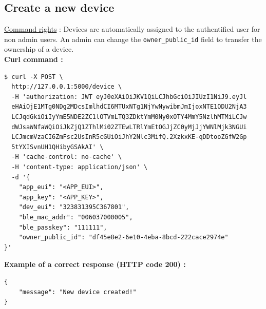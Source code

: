 \subsection{Create a new device}
\underline{Command rights} : Devices are automatically assigned to the authentified user for non admin users. An admin can change the \texttt{owner\_public\_id} field to transfer the ownership of a device.\\

\newpage
\textbf{Curl command :}

\begin{tcolorbox}[top=-3mm, bottom=-3mm, left=0mm, right=0mm, enhanced, breakable, colback=LightGray, colframe=DarkGray, colbacktitle=DarkGray]
\begin{verbatim}
$ curl -X POST \
  http://127.0.0.1:5000/device \
  -H 'authorization: JWT eyJ0eXAiOiJKV1QiLCJhbGciOiJIUzI1NiJ9.eyJl
  eHAiOjE1MTg0NDg2MDcsImlhdCI6MTUxNTg1NjYwNywibmJmIjoxNTE1ODU2NjA3
  LCJqdGkiOiIyYmE5NDE2ZC1lOTVmLTQ3ZDktYmM0Ny0xOTY4MmY5NzlhMTMiLCJw
  dWJsaWNfaWQiOiJkZjQ1ZThlMi02ZTEwLTRlYmEtOGJjZC0yMjJjYWNlMjk3NGUi
  LCJmcmVzaCI6ZmFsc2UsInR5cGUiOiJhY2Nlc3MifQ.2XzkxKE-qDDtooZGfW2Gp
  5tYXISvnUH1QHibyGSAkAI' \
  -H 'cache-control: no-cache' \
  -H 'content-type: application/json' \
  -d '{
    "app_eui": "<APP_EUI>",
    "app_key": "<APP_KEY>",
    "dev_eui": "323831395C367801",
    "ble_mac_addr": "006037000005",
    "ble_passkey": "111111",
    "owner_public_id": "df45e8e2-6e10-4eba-8bcd-222cace2974e"
}'
\end{verbatim}
\end{tcolorbox}

\textbf{Example of a correct response (HTTP code 200) : }

\begin{tcolorbox}[top=-3mm, bottom=-3mm, left=0mm, right=0mm, enhanced, breakable, colback=LightGray, colframe=DarkGray, colbacktitle=DarkGray]
\begin{verbatim}
{
    "message": "New device created!"
}
\end{verbatim}
\end{tcolorbox}



